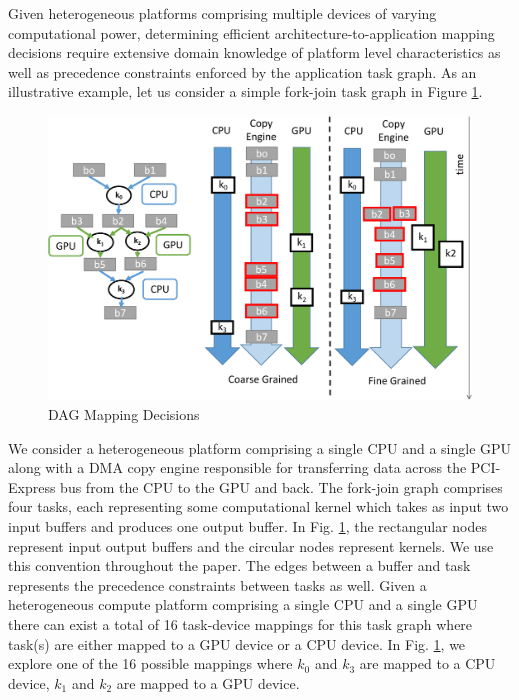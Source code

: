 	 Given heterogeneous platforms comprising multiple devices of varying computational power, determining efficient architecture-to-application mapping decisions require extensive domain knowledge of platform level characteristics as well as precedence constraints enforced by the application task graph. As an illustrative example, let us consider a simple fork-join task graph in Figure \ref{fig:dagmapping}.
	\begin{figure}[ht] 
		\centering
		\includegraphics[scale=0.35]{Pictures/TC_IntroPicNew.pdf}
		\caption{DAG Mapping Decisions \label{fig:dagmapping}}
    \end{figure}  
    
    We consider a heterogeneous platform comprising a single CPU and a single GPU along with a DMA copy engine responsible for transferring data across the PCI-Express bus from the CPU to the GPU and back. The fork-join graph comprises four tasks, each representing some computational kernel which takes as input two input buffers and produces one output buffer. In Fig. \ref{fig:dagmapping}, the rectangular nodes represent input output buffers and the circular nodes represent kernels. We use this convention throughout the paper. The edges between a buffer and task represents the precedence constraints between tasks as well. Given a heterogeneous compute platform comprising a single CPU and a single GPU there can exist a total of 16 task-device mappings for this task graph where task(s) are  either mapped to a GPU device or a CPU device. In Fig. \ref{fig:dagmapping}, we explore one of the 16 possible mappings where $k_0$ and $k_3$ are  mapped to a CPU device, $k_1$ and $k_2$ are mapped to a GPU device. 

